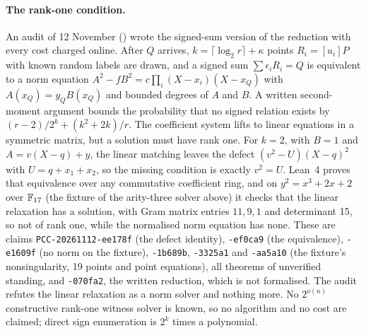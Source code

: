 \paragraph{The rank-one condition.} An audit of 12 November
() wrote the signed-sum
version of the reduction with every cost charged online. After $Q$
arrives, $k=\lceil\log_2r\rceil+\kappa$ points $R_i=[u_i]P$ with known
random labels are drawn, and a signed sum $\sum\epsilon_iR_i=Q$ is
equivalent to a norm equation $A^2-fB^2=c\prod_i(X-x_i)(X-x_Q)$ with
$A(x_Q)=y_QB(x_Q)$ and bounded degrees of $A$ and $B$. A written
second-moment argument bounds the probability that no signed relation
exists by $(r-2)/2^k+(k^2+2k)/r$. The coefficient system lifts to linear
equations in a symmetric matrix, but a solution must have rank one. For
$k=2$, with $B=1$ and $A=v(X-q)+y$, the linear matching leaves the defect
$(v^2-U)(X-q)^2$ with $U=q+x_1+x_2$, so the missing condition is exactly
$v^2=U$. Lean~4 proves that equivalence over any commutative coefficient
ring, and on $y^2=x^3+2x+2$ over $\mathbb{F}_{17}$ (the fixture of the arity-three
solver above) it checks that the linear relaxation has a solution, with
Gram matrix entries $11,9,1$ and determinant 15, so not of rank one, while
the normalised norm equation has none. These are
claims \texttt{PCC-20261112-ee178f} (the defect identity),
\texttt{-ef0ca9} (the equivalence), \texttt{-e1609f} (no norm on the
fixture), \texttt{-1b689b}, \texttt{-3325a1} and \texttt{-aa5a10} (the
fixture's nonsingularity, 19 points and point equations), all theorems of
unverified standing, and \texttt{-070fa2}, the written reduction, which is
not formalised. The audit refutes the linear relaxation as a norm solver
and nothing more. No $2^{o(n)}$ constructive rank-one witness solver is
known, so no algorithm and no cost are claimed; direct sign enumeration is
$2^k$ times a polynomial.

